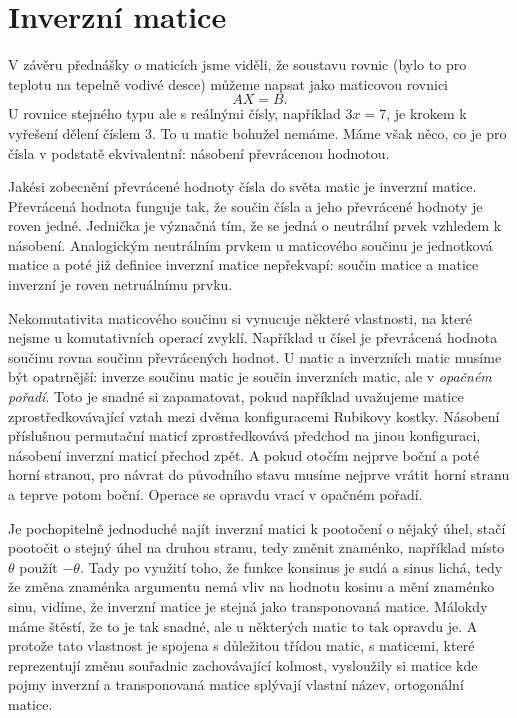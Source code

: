 \documentclass[12pt]{article}
\begin{document}
\section*{Inverzní matice}

V závěru přednášky o maticích jsme viděli, že soustavu rovnic (bylo to pro teplotu na tepelně vodivé desce) můžeme napsat jako maticovou rovnici $$AX=B.$$
U rovnice stejného typu ale s reálnými čísly, například $3x=7$, je krokem k vyřešení dělení číslem $3$. To u matic bohužel nemáme. Máme však něco, co je pro čísla v podstatě ekvivalentní: násobení převrácenou hodnotou.

Jakési zobecnění převrácené hodnoty čísla do světa matic je inverzní matice. Převrácená hodnota funguje tak, že součin čísla a jeho převrácené hodnoty je roven jedné. Jednička je význačná tím, že se jedná o neutrální prvek vzhledem k násobení. Analogickým neutrálním prvkem u maticového součinu je jednotková matice a poté již definice inverzní matice nepřekvapí: součin matice a matice inverzní je roven netruálnímu prvku.

Nekomutativita maticového součinu si vynucuje některé vlastnosti, na které nejsme u komutativních operací zvyklí. Například u čísel je převrácená hodnota součinu rovna součinu převrácených hodnot. U matic a inverzních matic musíme být opatrnější:  inverze součinu matic je součin inverzních matic, ale v \textit{opačném pořadí}. Toto je snadné si zapamatovat, pokud například uvažujeme matice zprostředkovávající vztah mezi dvěma konfiguracemi Rubikovy kostky. Násobení příslušnou permutační maticí zprostředkovává předchod na jinou konfiguraci, násobení inverzní maticí přechod zpět. A pokud otočím nejprve boční a poté horní stranou, pro návrat do původního stavu musíme nejprve vrátit horní stranu a teprve potom boční. Operace se opravdu vrací v opačném pořadí.

Je pochopitelně jednoduché najít inverzní matici k pootočení o nějaký úhel, stačí pootočit o stejný úhel na druhou stranu, tedy změnit znaménko, například místo $\theta$ použít $-\theta$. Tady po využití toho, že funkce konsinus je sudá a sinus lichá, tedy že změna znaménka argumentu nemá vliv na hodnotu kosinu a mění znaménko sinu, vidíme, že inverzní matice je stejná jako transponovaná matice. Málokdy máme štěstí, že to je tak snadné, ale u některých matic to tak opravdu je. A protože tato vlastnost je spojena s důležitou třídou matic, s maticemi, které reprezentují změnu souřadnic zachovávající kolmost, vysloužily si matice kde pojmy inverzní a transponovaná matice splývají vlastní název, ortogonální matice.
\end{document}
